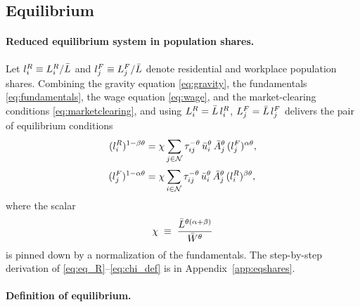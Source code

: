 \subsection{Equilibrium}\label{ssec:eq}

\paragraph{Reduced equilibrium system in population shares.}
Let $l_i^R\equiv L_i^R/\bar L$ and $l_j^F\equiv L_j^F/\bar L$ denote
residential and workplace population shares.  Combining the
gravity equation \eqref{eq:gravity}, the fundamentals
\eqref{eq:fundamentals}, the wage equation \eqref{eq:wage}, and the
market-clearing conditions \eqref{eq:marketclearing}, and using
$L_i^R=\bar L\,l_i^R$, $L_j^F=\bar L\,l_j^F$ delivers the pair of
equilibrium conditions
\begin{align}
  (l_i^R)^{1-\beta\theta}
  &=\chi\sum_{j\in\mathcal N}\tau_{ij}^{-\theta}\,\bar u_i^{\theta}\,\bar A_j^{\theta}\,
       (l_j^F)^{\alpha\theta},
  \label{eq:eq_R}\\[2pt]
  (l_j^F)^{1-\alpha\theta}
  &=\chi\sum_{i\in\mathcal N}\tau_{ij}^{-\theta}\,\bar u_i^{\theta}\,\bar A_j^{\theta}\,
       (l_i^R)^{\beta\theta},
  \label{eq:eq_F}
\end{align}
where the scalar
\begin{equation}
  \chi\;\equiv\;\frac{\bar L^{\theta(\alpha+\beta)}}{\bar W^{\theta}}
  \label{eq:chi_def}
\end{equation}
is pinned down by a normalization of the fundamentals.  The
step-by-step derivation of \eqref{eq:eq_R}--\eqref{eq:chi_def} is in
Appendix~\ref{app:eqshares}.

\paragraph{Definition of equilibrium.}

